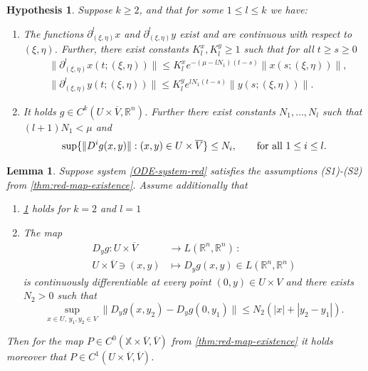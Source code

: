 \documentclass[10pt,a4paper]{amsart}
\newtheorem{lemma}{Lemma}
\newtheorem{hypothesis}{Hypothesis}
\newcommand{\RSet}{\mathbb{R}}
\newcommand{\XSet}{\mathbb{X}}
\begin{document}
 \begin{hypothesis}\label{hyp:red-map-l-derivatives}
Suppose $k \geq 2$, and that for some $1 \leq l \leq k$ we have:
\begin{enumerate}
\item 
  The functions $\partial^l_{(\xi,\eta)} x$ and $\partial^l_{(\xi,\eta) }y$
  exist and are continuous with respect to $(\xi,\eta)$. Further, there exist
  constants $K^x_l, K^y_l \geq 1$ such that for all $t \geq s \geq 0$ 
  \[
    \begin{aligned}
  & \| \partial^l_{(\xi,\eta) }x(t;(\xi,\eta)) \| 
    \leq K^x_l e^{-(\mu - l N_1) (t-s)} \|x(s;(\xi,\eta))\|, \\
  & \| \partial^l_{(\xi,\eta) }y(t;(\xi,\eta)) \| \leq 
  K^y_l e^{l N_1 (t-s)} \|y(s;(\xi,\eta))\|.
    \end{aligned}
  \]
\item 
  It holds $g \in C^k(U \times \overline{V}, \RSet^n)$. Further there exist 
  constants $N_1, \ldots, N_l$ such that $(l+1)N_1 < \mu$ and
\[
  \sup \{\|D^i g(x,y)\| : (x,y) \in U \times \overline{V} \} \leq N_i, \qquad \text{for all $ 1 \leq i \leq l$.}
\]
\end{enumerate}
\end{hypothesis}

 \begin{lemma}\label{lem:red-map-C1}
Suppose system \cref{ODE-system-red} satisfies the assumptions (S1)-(S2) from \cref{thm:red-map-existence}. Assume additionally that
\begin{enumerate}
\item \cref{hyp:red-map-l-derivatives} holds for $k=2$ and $l=1$
\item The map
 \begin{align*}
 D_y g : U \times \overline{V} &\rightarrow L(\RSet^n,\RSet^n) \, : \\
U \times \overline{V} \ni (x,y) &\mapsto D_y g(x, y) \in L( \RSet^n,\RSet^n)
 \end{align*}
is continuously differentiable at every point $(0,y) \in U \times V$ and there exists $N_2 > 0$ such that
\[
\sup_{x \in U, \, y_1,y_2 \in V} \| D_y g(x,y_2) - D_y g(0,y_1)  \| \leq N_2 (|x| + |y_2 - y_1|).
\]
\end{enumerate}
 Then for the map $P \in C^0(\XSet \times \overline{V}, \overline{V})$ from \cref{thm:red-map-existence} it holds moreover that $P \in  C^1(U \times \overline{V}, \overline{V})$.
 \end{lemma}
\end{document}
